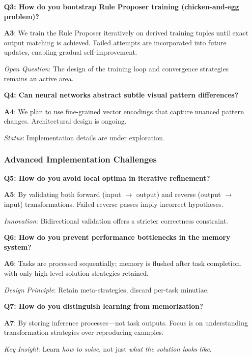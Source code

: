 \documentclass[12pt]{article}
\begin{document}
\textbf{Q3: How do you bootstrap Rule Proposer training (chicken-and-egg problem)?}

\textbf{A3}: We train the Rule Proposer iteratively on derived training tuples until exact output matching is achieved. Failed attempts are incorporated into future updates, enabling gradual self-improvement.

\textit{Open Question}: The design of the training loop and convergence strategies remains an active area.

\medskip

\textbf{Q4: Can neural networks abstract subtle visual pattern differences?}

\textbf{A4}: We plan to use fine-grained vector encodings that capture nuanced pattern changes. Architectural design is ongoing.

\textit{Status}: Implementation details are under exploration.

\subsubsection*{Advanced Implementation Challenges}

\textbf{Q5: How do you avoid local optima in iterative refinement?}

\textbf{A5}: By validating both forward (input $\rightarrow$ output) and reverse (output $\rightarrow$ input) transformations. Failed reverse passes imply incorrect hypotheses.

\textit{Innovation}: Bidirectional validation offers a stricter correctness constraint.

\medskip

\textbf{Q6: How do you prevent performance bottlenecks in the memory system?}

\textbf{A6}: Tasks are processed sequentially; memory is flushed after task completion, with only high-level solution strategies retained.

\textit{Design Principle}: Retain meta-strategies, discard per-task minutiae.

\medskip

\textbf{Q7: How do you distinguish learning from memorization?}

\textbf{A7}: By storing inference processes—not task outputs. Focus is on understanding transformation strategies over reproducing examples.

\textit{Key Insight}: Learn \textit{how to solve}, not just \textit{what the solution looks like}.
\end{document}
